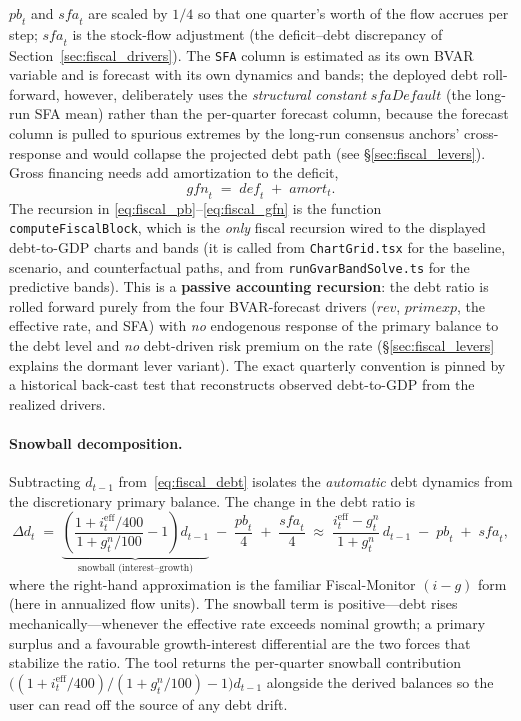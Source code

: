 \documentclass[11pt]{article}
\theoremstyle{definition}
\theoremstyle{remark}
\begin{document}
$\mathit{pb}_t$ and $\mathit{sfa}_t$ are scaled by $1/4$ so that one
quarter's worth of the flow accrues per step; $\mathit{sfa}_t$ is the
stock-flow adjustment (the deficit--debt discrepancy of
Section~\ref{sec:fiscal_drivers}). The \texttt{SFA} column is estimated
as its own BVAR variable and is forecast with its own dynamics and bands;
the deployed debt roll-forward, however, deliberately uses the
\emph{structural constant} $\mathit{sfaDefault}$ (the long-run SFA mean)
rather than the per-quarter forecast column, because the forecast column
is pulled to spurious extremes by the long-run consensus anchors'
cross-response and would collapse the projected debt path (see
\S\ref{sec:fiscal_levers}).  Gross financing needs add amortization to
the deficit,
\begin{equation}\label{eq:fiscal_gfn}
  \mathit{gfn}_t \;=\; \mathit{def}_t \;+\; \mathit{amort}_t .
\end{equation}
The recursion in
\eqref{eq:fiscal_pb}--\eqref{eq:fiscal_gfn} is the function
\texttt{computeFiscalBlock}, which is the \emph{only} fiscal recursion
wired to the displayed debt-to-GDP charts and bands (it is called from
\texttt{ChartGrid.tsx} for the baseline, scenario, and counterfactual
paths, and from \texttt{runGvarBandSolve.ts} for the predictive bands).
This is a \textbf{passive accounting recursion}: the debt ratio is
rolled forward purely from the four BVAR-forecast drivers
($\mathit{rev}$, $\mathit{primexp}$, the effective rate, and SFA) with
\emph{no} endogenous response of the primary balance to the debt level
and \emph{no} debt-driven risk premium on the rate
(\S\ref{sec:fiscal_levers} explains the dormant lever variant).  The
exact quarterly convention is pinned by a historical back-cast test that
reconstructs observed debt-to-GDP from the realized drivers.

\paragraph{Snowball decomposition.}  Subtracting $d_{t-1}$
from~\eqref{eq:fiscal_debt} isolates the \emph{automatic} debt dynamics
from the discretionary primary balance.  The change in the debt ratio is
\begin{equation}\label{eq:fiscal_snowball}
  \Delta d_t
  \;=\; \underbrace{\left(\frac{1 + i^{\text{eff}}_t/400}{1 + g^{n}_t/100} - 1\right) d_{t-1}}_{\text{snowball (interest--growth)}}
        \;-\; \frac{\mathit{pb}_t}{4}
        \;+\; \frac{\mathit{sfa}_t}{4}
  \;\approx\; \frac{i^{\text{eff}}_t - g^{n}_t}{1 + g^{n}_t}\, d_{t-1}
        \;-\; \mathit{pb}_t \;+\; \mathit{sfa}_t,
\end{equation}
where the right-hand approximation is the familiar Fiscal-Monitor
$(i-g)$ form (here in annualized flow units).  The snowball term is
positive---debt rises mechanically---whenever the effective rate exceeds
nominal growth; a primary surplus and a favourable growth-interest
differential are the two forces that stabilize the ratio.  The tool
returns the per-quarter snowball contribution
$\bigl((1+i^{\text{eff}}_t/400)/(1+g^{n}_t/100)-1\bigr)d_{t-1}$ alongside
the derived balances so the user can read off the source of any debt
drift.
\end{document}
